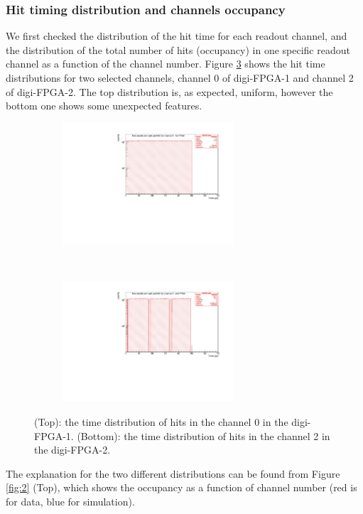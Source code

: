 \subsubsection{Hit timing distribution and channels occupancy}\label{over}
We first checked the distribution of the hit time for 
each readout channel, and the distribution of the 
total number of hits (occupancy) in one specific 
readout channel as a function of the channel number. 
Figure \ref{fig:1} shows the hit time 
distributions for two selected channels, 
channel 0 of digi-FPGA-1 and channel 2 of digi-FPGA-2.
The top distribution is, as expected, uniform, 
however the bottom one shows some unexpected features.
\begin{figure}[!h]
  \begin{subfigure}[b]{\textwidth}
      \centering
      \includegraphics[width=0.7\textwidth]{figures/pdf/figure_00007_timedistr_roc_simulation_ch0_281.pdf}
      \label{fig:t1}
  \end{subfigure}
\\
  \begin{subfigure}[b]{\textwidth}
      \centering
      \includegraphics[width=0.7\textwidth]{figures/pdf/figure_00003_timedistr_roc_simulation_ch2_281.pdf}
      \label{fig:t2}
  \end{subfigure}
     \caption[The time distribution of hits.]{(Top): the time distribution of hits in the channel 0 in the digi-FPGA-1.
     (Bottom): the time distribution of hits in the channel 2 in the digi-FPGA-2.}
     \label{fig:1}
\end{figure}
The explanation for the two different distributions 
can be found from Figure \ref{fig:2} (Top), 
which shows the occupancy as a function of channel number 
(red is for data, blue for simulation).

